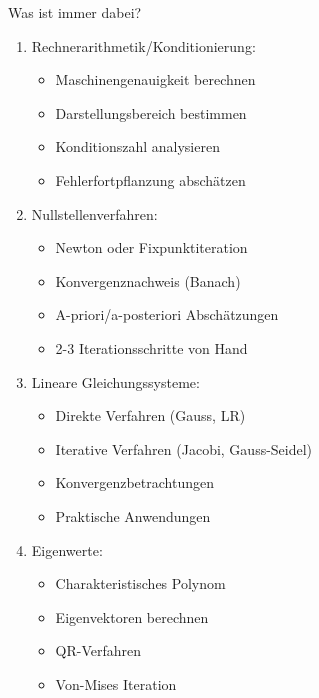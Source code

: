 \begin{KR}{Was ist immer dabei?}
\begin{enumerate}
    \item Rechnerarithmetik/Konditionierung:
    \begin{itemize}
        \item Maschinengenauigkeit berechnen
        \item Darstellungsbereich bestimmen
        \item Konditionszahl analysieren
        \item Fehlerfortpflanzung abschätzen
    \end{itemize}
    
    \item Nullstellenverfahren:
    \begin{itemize}
        \item Newton oder Fixpunktiteration
        \item Konvergenznachweis (Banach)
        \item A-priori/a-posteriori Abschätzungen
        \item 2-3 Iterationsschritte von Hand
    \end{itemize}
    
    \item Lineare Gleichungssysteme:
    \begin{itemize}
        \item Direkte Verfahren (Gauss, LR)
        \item Iterative Verfahren (Jacobi, Gauss-Seidel)
        \item Konvergenzbetrachtungen
        \item Praktische Anwendungen
    \end{itemize}
    
    \item Eigenwerte:
    \begin{itemize}
        \item Charakteristisches Polynom
        \item Eigenvektoren berechnen
        \item QR-Verfahren
        \item Von-Mises Iteration
    \end{itemize}
\end{enumerate}
\end{KR}

